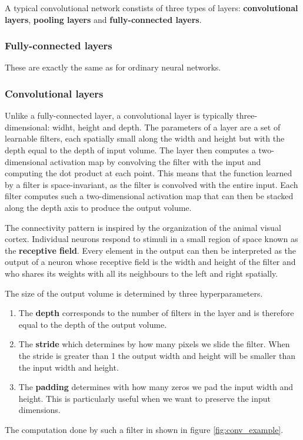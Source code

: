 \documentclass[12pt,a4paper,twoside,openright]{report}
\begin{document}
A typical convolutional network constists of three types of layers: \textbf{convolutional layers}, \textbf{pooling layers} and \textbf{fully-connected layers}. 
\subsubsection{Fully-connected layers}
These are exactly the same as for ordinary neural networks.

\subsubsection{Convolutional layers}
Unlike a fully-connected layer, a convolutional layer is typically three-dimensional: widht, height and depth. The parameters of a layer are a set of learnable filters, each spatially small along the width and height but with the depth equal to the depth of input volume. The layer then computes a two-dimensional activation map by convolving the filter with the input and computing the dot product at each point. This means that the function learned by a filter is space-invariant, as the filter is convolved with the entire input. Each filter computes such a two-dimensional activation map that can then be stacked along the depth axis to produce the output volume.

The connectivity pattern is inspired by the organization of the animal visual cortex. Individual neurons respond to stimuli in a small region of space known as the \textbf{receptive field}. Every element in the output can then be interpreted as the output of a neuron whose receptive field is the width and height of the filter and who shares its weights with all its neighbours to the left and right spatially.

The size of the output volume is determined by three hyperparameters.
\begin{enumerate}
	\item The \textbf{depth} corresponds to the number of filters in the layer and is therefore equal to the depth of the output volume.
	\item The \textbf{stride} which determines by how many pixels we slide the filter. When the stride is greater than 1 the output width and height will be smaller than the input width and height.
	\item The \textbf{padding} determines with how many zeros we pad the input width and height. This is particularly useful when we want to preserve the input dimensions.
\end{enumerate}
The computation done by such a filter in shown in figure \ref{fig:conv_example}.
\end{document}
